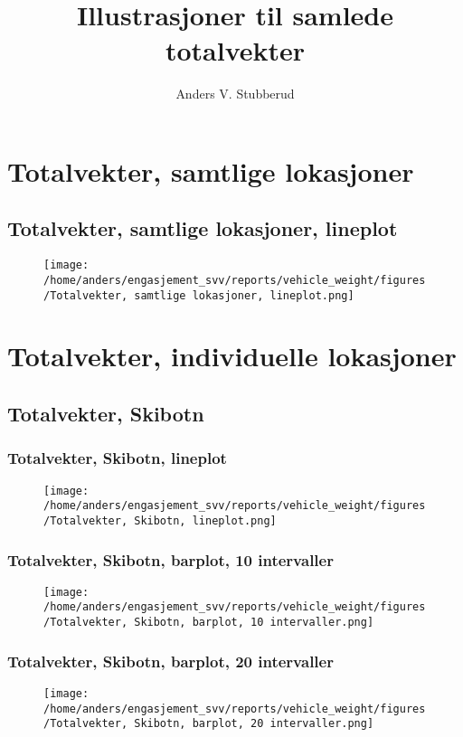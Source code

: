 \documentclass{article}
\begin{document}
\title{Illustrasjoner til samlede totalvekter}
\author{Anders V. Stubberud}
\maketitle
\tableofcontents
\newpage
\section{Totalvekter, samtlige lokasjoner}
\subsection{Totalvekter, samtlige lokasjoner, lineplot}
\begin{figure}[H]
\centering
\texttt{[image: /home/anders/engasjement\_svv/reports/vehicle\_weight/figures/Totalvekter, samtlige lokasjoner, lineplot.png]}
\end{figure}
\section{Totalvekter, individuelle lokasjoner}
\subsection{Totalvekter, Skibotn}
\subsubsection{Totalvekter, Skibotn, lineplot}
\begin{figure}[H]
\centering
\texttt{[image: /home/anders/engasjement\_svv/reports/vehicle\_weight/figures/Totalvekter, Skibotn, lineplot.png]}
\end{figure}
\subsubsection{Totalvekter, Skibotn, barplot, 10 intervaller}
\begin{figure}[H]
\centering
\texttt{[image: /home/anders/engasjement\_svv/reports/vehicle\_weight/figures/Totalvekter, Skibotn, barplot, 10 intervaller.png]}
\end{figure}
\subsubsection{Totalvekter, Skibotn, barplot, 20 intervaller}
\begin{figure}[H]
\centering
\texttt{[image: /home/anders/engasjement\_svv/reports/vehicle\_weight/figures/Totalvekter, Skibotn, barplot, 20 intervaller.png]}
\end{figure}
\end{document}
